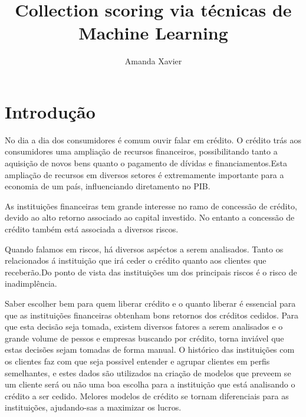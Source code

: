 \documentclass[12pt,a4paper]{article}
\title{Collection scoring via técnicas de Machine Learning} %
\author{Amanda Xavier} %
\begin{document}






\maketitle %

\newpage

\tableofcontents %
\listoffigures %
\listoftables %

\newpage

\section{Introdução} 

    No dia a dia dos consumidores é comum ouvir falar em crédito. O crédito trás aos consumidores uma ampliação de recursos financeiros, possibilitando tanto a aquisição de novos bens quanto o pagamento de dívidas e financiamentos.Esta ampliação de recursos em diversos setores é extremamente importante para a economia de um país, influenciando diretamento no PIB.
    
    As instituições financeiras tem grande interesse no ramo de concessão de crédito, devido ao alto retorno associado ao capital investido. No entanto a concessão de crédito também  está associada a diversos riscos. 
    
    Quando falamos em riscos, há diversos aspéctos a serem analisados. Tanto os relacionados á instituição que irá ceder o crédito quanto aos clientes que receberão.Do ponto de vista das instituições um dos principais riscos é o risco de inadimplência.
    
    Saber escolher bem para quem liberar crédito e o quanto liberar é essencial para que as instituições financeiras obtenham bons retornos dos créditos cedidos. Para que esta decisão seja tomada, existem diversos fatores a serem analisados e o grande volume de pessos e empresas buscando por crédito, torna inviável que estas decisões sejam tomadas de forma manual. O histórico das instituições com os clientes faz com que seja possivel entender e agrupar clientes em perfis semelhantes, e estes dados são utilizados na criação de modelos que preveem se um cliente será ou não uma boa escolha para a instituição que está analisando o crédito a ser cedido. Melores modelos de crédito se tornam diferenciais para as instituições, ajudando-sas a maximizar os lucros.
    
\end{document}
